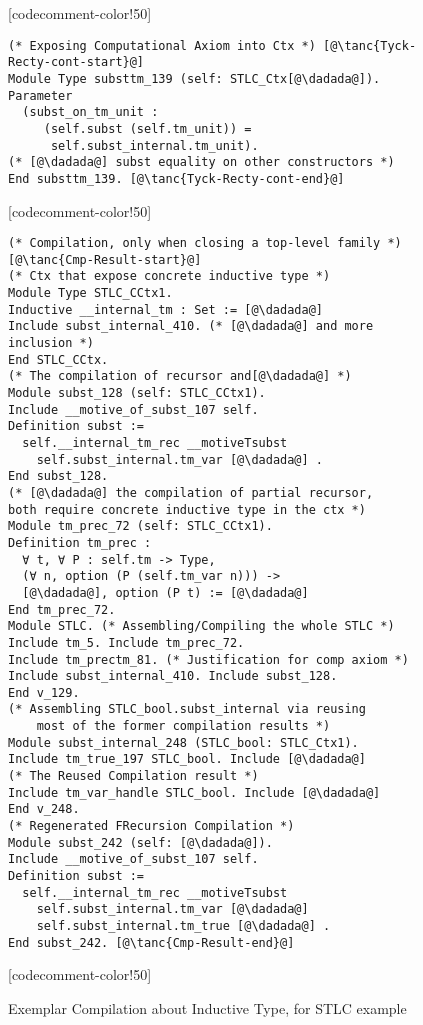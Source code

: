 \begin{figure}
\begin{minipage}{\textwidth}
\begin{multicols}{2}
[codecomment-color!50]

\columnbreak



\begin{lstlisting}
(* Exposing Computational Axiom into Ctx *) [@\tanc{Tyck-Recty-cont-start}@]
Module Type substtm_139 (self: STLC_Ctx[@\dadada@]).
Parameter
  (subst_on_tm_unit :
	 (self.subst (self.tm_unit)) = 
      self.subst_internal.tm_unit).
(* [@\dadada@] subst equality on other constructors *)
End substtm_139. [@\tanc{Tyck-Recty-cont-end}@]
\end{lstlisting}



[codecomment-color!50]



\begin{lstlisting}
(* Compilation, only when closing a top-level family *) [@\tanc{Cmp-Result-start}@]
(* Ctx that expose concrete inductive type *)
Module Type STLC_CCtx1.
Inductive __internal_tm : Set := [@\dadada@] 
Include subst_internal_410. (* [@\dadada@] and more inclusion *)
End STLC_CCtx.
(* The compilation of recursor and[@\dadada@] *)
Module subst_128 (self: STLC_CCtx1).
Include __motive_of_subst_107 self.
Definition subst :=
  self.__internal_tm_rec __motiveTsubst
	self.subst_internal.tm_var [@\dadada@] .
End subst_128.
(* [@\dadada@] the compilation of partial recursor, 
both require concrete inductive type in the ctx *)
Module tm_prec_72 (self: STLC_CCtx1).
Definition tm_prec :
  ∀ t, ∀ P : self.tm -> Type,
  (∀ n, option (P (self.tm_var n))) ->
  [@\dadada@], option (P t) := [@\dadada@]
End tm_prec_72. 
Module STLC. (* Assembling/Compiling the whole STLC *)
Include tm_5. Include tm_prec_72. 
Include tm_prectm_81. (* Justification for comp axiom *)
Include subst_internal_410. Include subst_128.
End v_129.
(* Assembling STLC_bool.subst_internal via reusing 
    most of the former compilation results *)
Module subst_internal_248 (STLC_bool: STLC_Ctx1).
Include tm_true_197 STLC_bool. Include [@\dadada@]
(* The Reused Compilation result *)
Include tm_var_handle STLC_bool. Include [@\dadada@]
End v_248. 
(* Regenerated FRecursion Compilation *)
Module subst_242 (self: [@\dadada@]).
Include __motive_of_subst_107 self.
Definition subst :=
  self.__internal_tm_rec __motiveTsubst
	self.subst_internal.tm_var [@\dadada@]
    self.subst_internal.tm_true [@\dadada@] .
End subst_242. [@\tanc{Cmp-Result-end}@]
\end{lstlisting}



[codecomment-color!50]

\end{multicols}
\end{minipage}

\caption{Exemplar Compilation about Inductive Type, for STLC example}\label{fig:plugin-example2}
\end{figure}